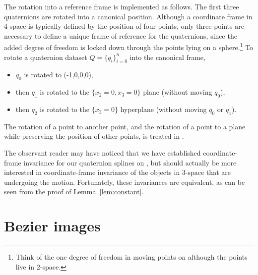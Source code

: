 \documentclass[12pt]{article}
\begin{document}
The rotation into a reference frame is implemented as follows.
The first three quaternions are rotated into a canonical position.
Although a coordinate frame in 4-space is typically defined by the position of 
four points, only three points are necessary to define a unique frame of reference
for the quaternions,
since the added degree of freedom is locked down through the points lying 
on a sphere.\footnote{Think of the one degree of freedom in moving points on 
  although the points live in 2-space.}
To rotate a quaternion dataset $Q = \{q_i\}_{i=0}^n$ into the canonical frame,
\begin{itemize}
\item $q_0$ is rotated to (-1,0,0,0),  %
\item then $q_1$ is rotated to the $\{x_2=0,x_3=0\}$ plane (without moving $q_0$),
\item then $q_2$ is rotated to the $\{x_2=0\}$ hyperplane (without moving $q_0$ or $q_1$).
\end{itemize}
The rotation of a point to another point, and the rotation of a point to a plane
while preserving the position of other points, is treated in \cite{jjrotation05}.

The observant reader may have noticed that we have established
coordinate-frame invariance for our quaternion splines on ,
but should actually be more interested in coordinate-frame invariance 
of the objects in 3-space that are undergoing the motion.
Fortunately, these invariances are equivalent, as can be seen 
from the proof of Lemma~\ref{lem:constant}.

\clearpage

\section{Bezier images}
\label{sec:bezierimage}
\end{document}

